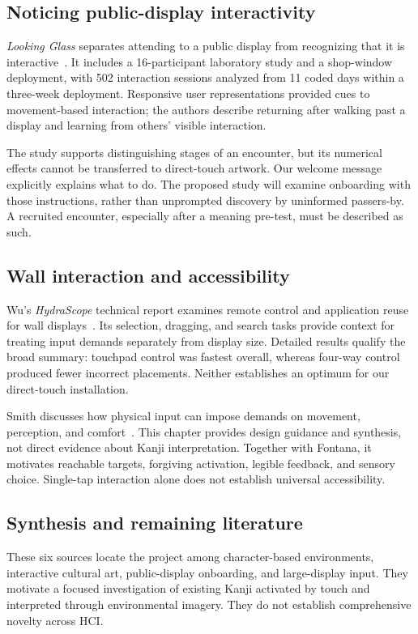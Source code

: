 \documentclass[11pt,letterpaper]{article}
\begin{document}
\subsection{Noticing public-display interactivity}
\emph{Looking Glass} separates attending to a public display from recognizing that it is interactive~\cite{mueller2012}. It includes a 16-participant laboratory study and a shop-window deployment, with 502 interaction sessions analyzed from 11 coded days within a three-week deployment. Responsive user representations provided cues to movement-based interaction; the authors describe returning after walking past a display and learning from others' visible interaction.

The study supports distinguishing stages of an encounter, but its numerical effects cannot be transferred to direct-touch artwork. Our welcome message explicitly explains what to do. The proposed study will examine onboarding with those instructions, rather than unprompted discovery by uninformed passers-by. A recruited encounter, especially after a meaning pre-test, must be described as such.

\subsection{Wall interaction and accessibility}
Wu's \emph{HydraScope} technical report examines remote control and application reuse for wall displays~\cite{wu2012}. Its selection, dragging, and search tasks provide context for treating input demands separately from display size. Detailed results qualify the broad summary: touchpad control was fastest overall, whereas four-way control produced fewer incorrect placements. Neither establishes an optimum for our direct-touch installation.

Smith discusses how physical input can impose demands on movement, perception, and comfort~\cite{smith2013}. This chapter provides design guidance and synthesis, not direct evidence about Kanji interpretation. Together with Fontana, it motivates reachable targets, forgiving activation, legible feedback, and sensory choice. Single-tap interaction alone does not establish universal accessibility.

\subsection{Synthesis and remaining literature}
These six sources locate the project among character-based environments, interactive cultural art, public-display onboarding, and large-display input. They motivate a focused investigation of existing Kanji activated by touch and interpreted through environmental imagery. They do not establish comprehensive novelty across HCI.
\end{document}
